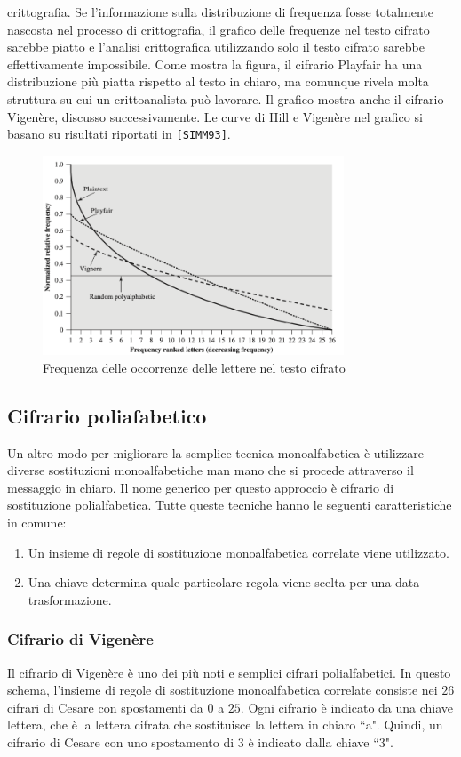 crittografia. Se l'informazione sulla distribuzione di frequenza fosse totalmente nascosta nel processo
di crittografia, il grafico delle frequenze nel testo cifrato sarebbe piatto e l'analisi crittografica
utilizzando solo il testo cifrato sarebbe effettivamente impossibile. Come mostra la figura, il cifrario
Playfair ha una distribuzione più piatta rispetto al testo in chiaro, ma comunque rivela molta struttura
su cui un crittoanalista può lavorare. Il grafico mostra anche il cifrario Vigenère, discusso
successivamente. Le curve di Hill e Vigenère nel grafico si basano su risultati riportati in \verb|[SIMM93]|.
\begin{figure}[H]
    \centering
    \includegraphics[width=0.8\textwidth]{img/frequenza_playfair.png}
    \caption{Frequenza delle occorrenze delle lettere nel testo cifrato}
    \label{fig:playfair}
\end{figure}
\subsection{Cifrario poliafabetico}
Un altro modo per migliorare la semplice tecnica monoalfabetica è utilizzare diverse sostituzioni monoalfabetiche man mano che si procede attraverso il messaggio in chiaro. Il nome generico per questo approccio è cifrario di sostituzione polialfabetica. Tutte queste tecniche hanno le seguenti caratteristiche in comune:

\begin{enumerate}
  \item Un insieme di regole di sostituzione monoalfabetica correlate viene utilizzato.
  \item Una chiave determina quale particolare regola viene scelta per una data trasformazione.
\end{enumerate}

\subsubsection{Cifrario di Vigenère}
Il cifrario di Vigenère è uno dei più noti e semplici cifrari polialfabetici.
In questo schema, l'insieme di regole di sostituzione monoalfabetica correlate consiste
nei $26$ cifrari di Cesare con spostamenti da $0$ a $25$. Ogni cifrario è indicato da una chiave
lettera, che è la lettera cifrata che sostituisce la lettera in chiaro ``a". Quindi, un
cifrario di Cesare con uno spostamento di 3 è indicato dalla chiave ``3".


